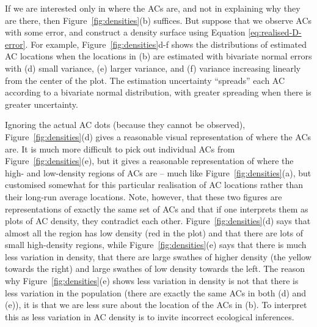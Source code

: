 \documentclass[useAMS,usenatbib,referee]{biom}
\begin{document}
If we are interested only in where the ACs are, and not in explaining why they are there, then Figure~\ref{fig:densities}(b) suffices. But suppose that we observe ACs with some error, and construct a density surface using Equation \eqref{eq:realised-D-error}. For example, Figure~\ref{fig:densities}d-f shows the distributions of estimated AC locations when the locations in (b) are estimated with bivariate normal errors with (d) small variance, (e) larger variance, and (f) variance increasing linearly from the center of the plot. The estimation uncertainty ``spreads'' each AC according to a bivariate normal distribution, with greater spreading when there is greater uncertainty.


Ignoring the actual AC dots (because they cannot be observed), Figure~\ref{fig:densities}(d) gives a reasonable visual representation of where the ACs are. It is much more difficult to pick out individual ACs from Figure~\ref{fig:densities}(e), but it gives a reasonable representation of where the high- and low-density regions of ACs are -- much like Figure~\ref{fig:densities}(a), but customised somewhat for this particular realisation of AC locations rather than their long-run average locations. Note, however, that these two figures are representations of exactly the same set of ACs and that if one interprets them as plots of AC density, they contradict each other. Figure~\ref{fig:densities}(d) says that almost all the region has low density (red in the plot) and that there are lots of small high-density regions, while Figure~\ref{fig:densities}(e) says that there is much less variation in density, that there are large swathes of higher density (the yellow towards the right) and large swathes of low density towards the left. The reason why Figure~\ref{fig:densities}(e) shows less variation in density is not that there is less variation in the population (there are exactly the same ACs in both (d) and (e)), it is that we are less sure about the location of the ACs in (b). To interpret this as less variation in AC density is to invite incorrect ecological inferences.
\end{document}
